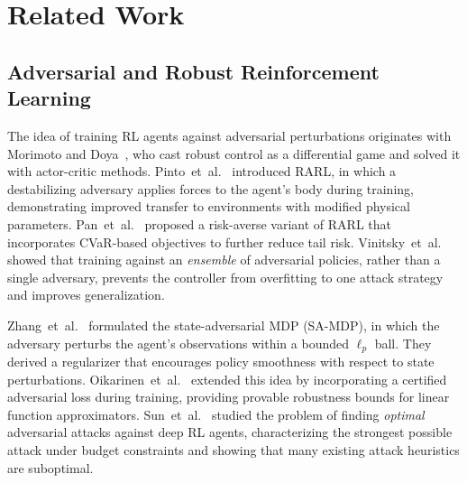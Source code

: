 \documentclass[conference]{IEEEtran}
\begin{document}
\section{Related Work}\label{sec:related}

\subsection{Adversarial and Robust Reinforcement Learning}

The idea of training RL agents against adversarial perturbations
originates with Morimoto and Doya~\cite{morimoto2005robust}, who cast
robust control as a differential game and solved it with actor-critic
methods.  Pinto~et~al.~\cite{pinto2017robust} introduced RARL, in which
a destabilizing adversary applies forces to the agent's body during
training, demonstrating improved transfer to environments with
modified physical parameters.  Pan~et~al.~\cite{pan2019risk} proposed a
risk-averse variant of RARL that incorporates CVaR-based objectives to
further reduce tail risk.  Vinitsky~et~al.~\cite{vinitsky2020robust}
showed that training against an \emph{ensemble} of adversarial policies,
rather than a single adversary, prevents the controller from overfitting
to one attack strategy and improves generalization.

Zhang~et~al.~\cite{zhang2020robust} formulated the state-adversarial MDP
(SA-MDP), in which the adversary perturbs the agent's observations
within a bounded $\ell_p$ ball.  They derived a regularizer that
encourages policy smoothness with respect to state perturbations.
Oikarinen~et~al.~\cite{oikarinen2021robust} extended this idea by
incorporating a certified adversarial loss during training, providing
provable robustness bounds for linear function approximators.
Sun~et~al.~\cite{sun2022strongest} studied the problem of finding
\emph{optimal} adversarial attacks against deep RL agents, characterizing
the strongest possible attack under budget constraints and showing that
many existing attack heuristics are suboptimal.
\end{document}
